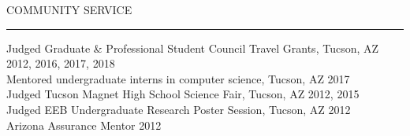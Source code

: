 \documentclass{resume} %
\renewenvironment{rSection}[1]{
\sectionskip
\textcolor{RoyalPurple}{\MakeUppercase{#1}}
\sectionlineskip
\hrule
\begin{list}{}{
\setlength{\leftmargin}{1.5em}
}
\item[]
}{
\end{list}
}
\begin{document}


    


\begin{rSection}{Community Service}

    Judged Graduate \& Professional Student Council Travel Grants, Tucson, AZ \hfill 2012, 2016, 2017, 2018\\
    Mentored undergraduate interns in computer science, Tucson, AZ \hfill 2017\\    
    Judged Tucson Magnet High School Science Fair, Tucson, AZ \hfill 2012, 2015\\
    Judged EEB Undergraduate Research Poster Session, Tucson, AZ \hfill 2012\\
    Arizona Assurance Mentor \hfill 2012

    
    \end{rSection}




\end{document}
